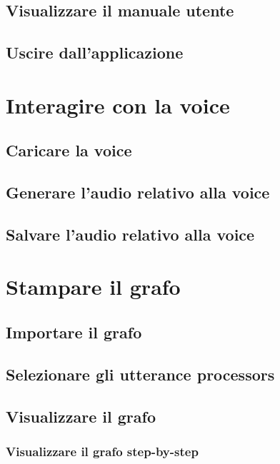 \documentclass[openany,12pt,a4paper]{report}
\begin{document}
	\subsection{Visualizzare il manuale utente}
	
	\subsection{Uscire dall'applicazione}
	
	\section{Interagire con la voice}
	
	\subsection{Caricare la voice}
	
	\subsection{Generare l'audio relativo alla voice}
	
	\subsection{Salvare l'audio relativo alla voice}
	
	\section{Stampare il grafo}
	
	\subsection{Importare il grafo}
	
	\subsection{Selezionare gli utterance processors}
	
	\subsection{Visualizzare il grafo}
	
	\subsubsection{Visualizzare il grafo step-by-step}
	
\end{document}
